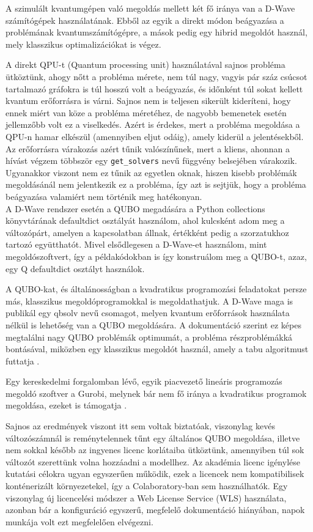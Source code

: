 A szimulált kvantumgépen való megoldás mellett két fő iránya van a D-Wave számítógépek használatának. Ebből az egyik a direkt módon beágyazása a problémának kvantumszámítógépre, a mások pedig egy hibrid megoldót használ, mely klasszikus optimalizációkat is végez.

A direkt QPU-t (Quantum processing unit) használatával sajnos probléma ütköztünk, ahogy nőtt a probléma mérete, nem túl nagy, vagyis pár száz csúcsot tartalmazó gráfokra is túl hosszú volt a beágyazás, és időnként túl sokat kellett kvantum erőforrásra is várni. Sajnos nem is teljesen sikerült kideríteni, hogy ennek miért van köze a probléma méretéhez, de nagyobb bemenetek esetén jellemzőbb volt ez a viselkedés. Azért is érdekes, mert a probléma megoldása a QPU-n hamar elkészül (amennyiben eljut odáig), amely kiderül a jelentésekből. Az erőforrásra várakozás azért tűnik valószínűnek, mert a kliens, ahonnan a hívást végzem többször egy \verb+get_solvers+ nevű függvény belsejében várakozik. Ugyanakkor viszont nem ez tűnik az egyetlen oknak, hiszen kisebb problémák megoldásánál nem jelentkezik ez a probléma, így azt is sejtjük, hogy a probléma beágyazása valamiért nem történik meg hatékonyan.\\

A D-Wave rendszer esetén a QUBO megadására a Python collections könyvtárának defaultdict osztályát használom, ahol kulcsként adom meg a változópárt, amelyen a kapcsolatban állnak, értékként pedig a szorzatukhoz tartozó együtthatót. Mivel elsődlegesen a D-Wave-et használom, mint megoldószoftvert, így a példakódokban is így konstruálom meg a QUBO-t, azaz, egy Q defaultdict osztályt használok.


A QUBO-kat, és általánosságban a kvadratikus programozási feladatokat persze más, klasszikus megoldóprogramokkal is megoldathatjuk. A D-Wave maga is publikál egy qbsolv nevű csomagot, melyen kvantum erőforrások használata nélkül is lehetőség van a QUBO megoldására. A dokumentáció szerint ez képes megtalálni nagy QUBO problémák optimumát, a probléma részproblémákká bontásával, miközben egy klasszikus megoldót használ, amely a tabu algoritmust futtatja \cite{DWaveOceanQbsolv}. 

Egy kereskedelmi forgalomban lévő, egyik piacvezető lineáris programozás megoldó szoftver a Gurobi, melynek bár nem fő iránya a kvadratikus programok megoldása, ezeket is támogatja \cite{gurobi}. 

Sajnos az eredmények viszont itt sem voltak biztatóak, viszonylag kevés változószámnál is reménytelennek tűnt egy általános QUBO megoldása, illetve nem sokkal később az ingyenes licenc korlátaiba ütköztünk, amennyiben túl sok változót szerettünk volna hozzáadni a modellhez. Az akadémia licenc igénylése kutatási célokra ugyan egyszerűen működik, ezek a licencek nem kompatibilisek konténerizált környezetekel, így a Colaboratory-ban sem használhatók. Egy viszonylag új licencelési módszer a Web License Service (WLS) használata, azonban bár a konfiguráció egyszerű, megfelelő dokumentáció hiányában, napok munkája volt ezt megfelelően elvégezni.

